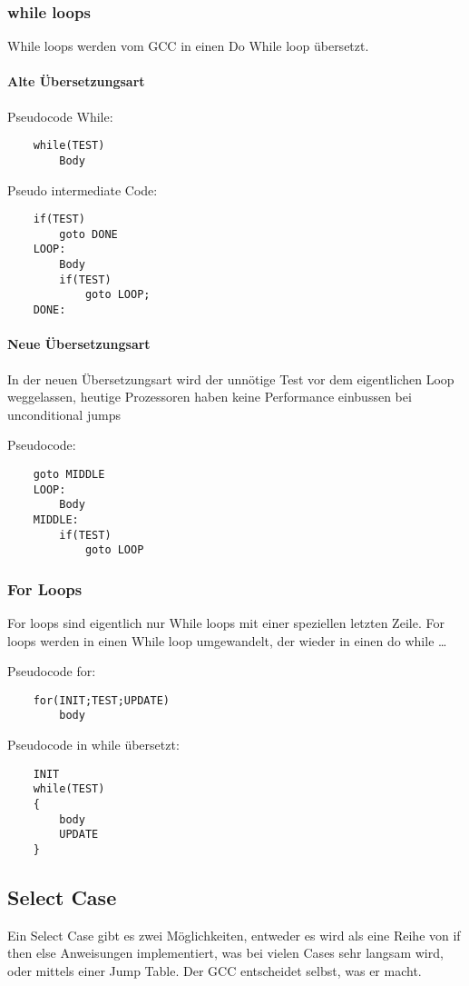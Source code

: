 \documentclass[a4paper, 11pt]{article}
\begin{document}
\subsubsection{while loops}
While loops werden vom GCC in einen Do While loop übersetzt.

\paragraph{Alte Übersetzungsart}
Pseudocode While:
\begin{lstlisting}
	while(TEST)
		Body
\end{lstlisting}

Pseudo intermediate Code:
\begin{lstlisting}
	if(TEST)
		goto DONE
	LOOP:
		Body
		if(TEST)
			goto LOOP;
	DONE:
\end{lstlisting}

\paragraph{Neue Übersetzungsart}
In der neuen Übersetzungsart wird der unnötige Test vor dem eigentlichen Loop weggelassen, heutige Prozessoren haben keine Performance einbussen bei unconditional jumps

Pseudocode:
\begin{lstlisting}
	goto MIDDLE
	LOOP:
		Body
	MIDDLE:
		if(TEST)
			goto LOOP
\end{lstlisting}

\subsubsection{For Loops}
For loops sind eigentlich nur While loops mit einer speziellen letzten Zeile. For loops werden in einen While loop umgewandelt, der wieder in einen do while \ldots

Pseudocode for:
\begin{lstlisting}
	for(INIT;TEST;UPDATE)
		body
\end{lstlisting}

Pseudocode in while übersetzt:
\begin{lstlisting}
	INIT
	while(TEST)
	{
		body
		UPDATE
	}
\end{lstlisting}

\subsection{Select Case}
Ein Select Case gibt es zwei Möglichkeiten, entweder es wird als eine Reihe von if then else Anweisungen implementiert, was bei vielen Cases sehr langsam wird, oder mittels einer Jump Table. Der GCC entscheidet selbst, was er macht.
\end{document}
